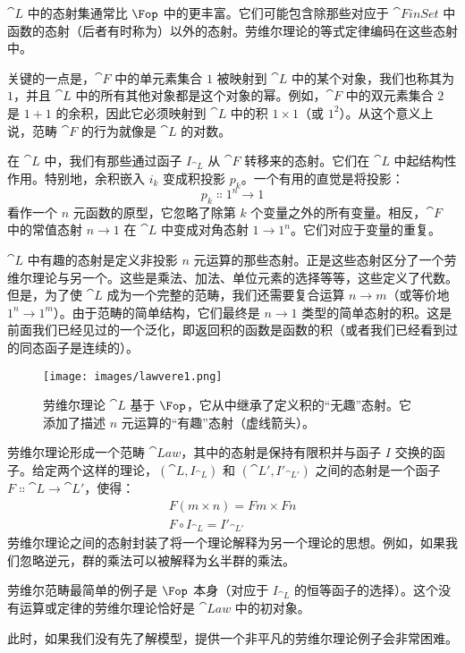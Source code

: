 $\cat{L}$ 中的态射集通常比 $\Fop$ 中的更丰富。它们可能包含除那些对应于 $\cat{FinSet}$ 中函数的态射（后者有时称为）以外的态射。劳维尔理论的等式定律编码在这些态射中。

关键的一点是，$\cat{F}$ 中的单元素集合 $1$ 被映射到 $\cat{L}$ 中的某个对象，我们也称其为 $1$，并且 $\cat{L}$ 中的所有其他对象都是这个对象的幂。例如，$\cat{F}$ 中的双元素集合 $2$ 是 $1 + 1$ 的余积，因此它必须映射到 $\cat{L}$ 中的积 $1 \times 1$（或 $1^2$）。从这个意义上说，范畴 $\cat{F}$ 的行为就像是 $\cat{L}$ 的对数。

在 $\cat{L}$ 中，我们有那些通过函子 $I_{\cat{L}}$ 从 $\cat{F}$ 转移来的态射。它们在 $\cat{L}$ 中起结构性作用。特别地，余积嵌入 $i_k$ 变成积投影 $p_k$。一个有用的直觉是将投影：
\[p_k \Colon 1^n \to 1\]
看作一个 $n$ 元函数的原型，它忽略了除第 $k$ 个变量之外的所有变量。相反，$\cat{F}$ 中的常值态射 $n \to 1$ 在 $\cat{L}$ 中变成对角态射 $1 \to 1^n$。它们对应于变量的重复。

$\cat{L}$ 中有趣的态射是定义非投影 $n$ 元运算的那些态射。正是这些态射区分了一个劳维尔理论与另一个。这些是乘法、加法、单位元素的选择等等，这些定义了代数。但是，为了使 $\cat{L}$ 成为一个完整的范畴，我们还需要复合运算 $n \to m$（或等价地 $1^n \to 1^m$）。由于范畴的简单结构，它们最终是 $n \to 1$ 类型的简单态射的积。这是前面我们已经见过的一个泛化，即返回积的函数是函数的积（或者我们已经看到过的同态函子是连续的）。

\begin{figure}[H]
  \centering
  \texttt{[image: images/lawvere1.png]}
  \caption{劳维尔理论 $\cat{L}$ 基于 $\Fop$，它从中继承了定义积的“无趣”态射。它添加了描述 $n$ 元运算的“有趣”态射（虚线箭头）。}
\end{figure}

劳维尔理论形成一个范畴 $\cat{Law}$，其中的态射是保持有限积并与函子 $I$ 交换的函子。给定两个这样的理论，$(\cat{L}, I_{\cat{L}})$ 和 $(\cat{L'}, I'_{\cat{L'}})$ 之间的态射是一个函子 $F \Colon \cat{L} \to \cat{L'}$，使得：
\begin{gather*}
  F (m \times n) = F m \times F n \\
  F \circ I_{\cat{L}} = I'_{\cat{L'}}
\end{gather*}
劳维尔理论之间的态射封装了将一个理论解释为另一个理论的思想。例如，如果我们忽略逆元，群的乘法可以被解释为幺半群的乘法。

劳维尔范畴最简单的例子是 $\Fop$ 本身（对应于 $I_{\cat{L}}$ 的恒等函子的选择）。这个没有运算或定律的劳维尔理论恰好是 $\cat{Law}$ 中的初对象。

此时，如果我们没有先了解模型，提供一个非平凡的劳维尔理论例子会非常困难。

